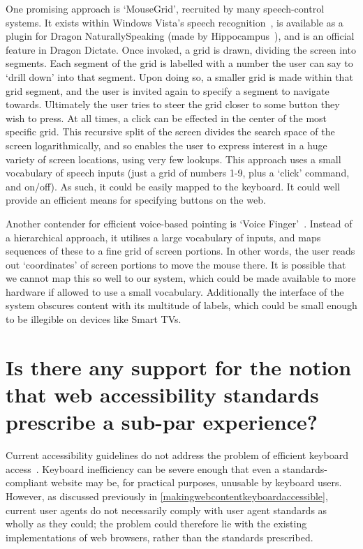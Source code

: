 \documentclass[a4paper, 12pt]{report}
\begin{document}
One promising approach is `MouseGrid', recruited by many speech-control systems. It exists within Windows Vista's speech recognition~\cite{vistamousegrid}, is available as a plugin for Dragon NaturallySpeaking (made by Hippocampus~\cite{hippogrid}), and is an official feature in Dragon Dictate\cite{nuancegrid}. Once invoked, a grid is drawn, dividing the screen into segments. Each segment of the grid is labelled with a number the user can say to `drill down' into that segment. Upon doing so, a smaller grid is made within that grid segment, and the user is invited again to specify a segment to navigate towards. Ultimately the user tries to steer the grid closer to some button they wish to press.
At all times, a click can be effected in the center of the most specific grid. This recursive split of the screen divides the search space of the screen logarithmically, and so enables the user to express interest in a huge variety of screen locations, using very few lookups.
This approach uses a small vocabulary of speech inputs (just a grid of numbers 1-9, plus a `click' command, and on/off). As such, it could be easily mapped to the keyboard. It could well provide an efficient means for specifying buttons on the web.

Another contender for efficient voice-based pointing is `Voice Finger'~\cite{voicefinger}. Instead of a hierarchical approach, it utilises a large vocabulary of inputs, and maps sequences of these to a fine grid of screen portions. In other words, the user reads out `coordinates' of screen portions to move the mouse there. It is possible that we cannot map this so well to our system, which could be made available to more hardware if allowed to use a small vocabulary. Additionally the interface of the system obscures content with its multitude of labels, which could be small enough to be illegible on devices like Smart TVs.
\section{Is there any support for the notion that web accessibility standards prescribe a sub-par experience?}
\label{subparstandards}
Current accessibility guidelines do not address the problem of efficient keyboard access~\cite{schrepp2006efficiency}. Keyboard inefficiency can be severe enough that even a standards-compliant website may be, for practical purposes, unusable by keyboard users\cite{schrepp2006efficiency,coyne2001beyond,powlik2002accessibility}. However, as discussed previously in \cref{makingwebcontentkeyboardaccessible}, current user agents do not necessarily comply with user agent standards as wholly as they could; the problem could therefore lie with the existing implementations of web browsers, rather than the standards prescribed.
\end{document}
